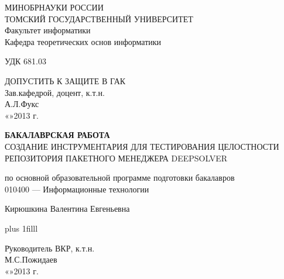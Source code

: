 \normalsize
\thispagestyle{empty}
\begin{center}
МИНОБРНАУКИ РОССИИ\\
ТОМСКИЙ ГОСУДАРСТВЕННЫЙ УНИВЕРСИТЕТ\\
Факультет информатики\\
Кафедра теоретических основ информатики\\
\end{center}

\vspace{0.7cm}

УДК 681.03

\vspace{0.5cm}

\begin{flushright}
ДОПУСТИТЬ К ЗАЩИТЕ В ГАК\\
Зав.кафедрой, доцент, к.т.н.\\
\makebox[3cm]{\hrulefill}А.Л.Фукс\\
«\makebox[0.8cm]{\hrulefill}»\makebox[1.5cm]{\hrulefill}2013 г.\\
\end{flushright}



\begin{center}

\vspace{1.5cm}
{\bf БАКАЛАВРСКАЯ РАБОТА}\\
\vspace{0.5cm}
СОЗДАНИЕ ИНСТРУМЕНТАРИЯ ДЛЯ ТЕСТИРОВАНИЯ ЦЕЛОСТНОСТИ РЕПОЗИТОРИЯ ПАКЕТНОГО МЕНЕДЖЕРА DEEPSOLVER

\vspace{0.5cm}
по основной образовательной программе подготовки бакалавров\\
010400 --- Информационные технологии

\vspace{0.5cm}

Кирюшкина Валентина Евгеньевна


\end{center}

\vskip 0pt plus 1filll

\begin{tabbing}
\hspace{10cm}\=Руководитель ВКР, к.т.н.\\
\>\makebox[3cm]{\hrulefill}М.С.Пожидаев\\
\>«\makebox[0.8cm]{\hrulefill}»\makebox[1.5cm]{\hrulefill}2013 г.\\
\end{tabbing}

